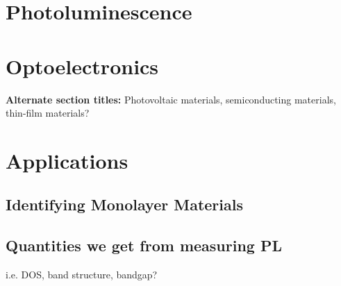 \section{Photoluminescence}
\section{Optoelectronics}
\textbf{Alternate section titles:} Photovoltaic materials, semiconducting materials, thin-film materials?
\section{Applications}
\subsection{Identifying Monolayer Materials}
\subsection{Quantities we get from measuring PL}
i.e. DOS, band structure, bandgap?